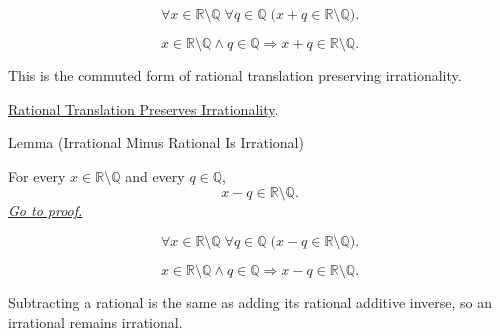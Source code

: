 \begin{remark*}
\[
\forall x\in\mathbb{R}\setminus\mathbb{Q}\;\forall q\in\mathbb{Q}\;
\bigl(x+q\in\mathbb{R}\setminus\mathbb{Q}\bigr).
\]
\end{remark*}

\begin{remark*}
\[
x\in\mathbb{R}\setminus\mathbb{Q}\land q\in\mathbb{Q}
\Longrightarrow x+q\in\mathbb{R}\setminus\mathbb{Q}.
\]
\end{remark*}

\begin{remark*}[Interpretation]
This is the commuted form of rational translation preserving irrationality.
\end{remark*}

\begin{dependencies}
\hyperref[lem:rational-translation-preserves-irrationality]{Rational Translation Preserves Irrationality}.
\end{dependencies}

\begin{lemmabox}{Lemma (Irrational Minus Rational Is Irrational)}
\begin{lemma}
\label{lem:irrational-minus-rational-is-irrational}
For every $x\in\mathbb{R}\setminus\mathbb{Q}$ and every $q\in\mathbb{Q}$,
\[
  x-q\in\mathbb{R}\setminus\mathbb{Q}.
\]
\hyperref[prf:irrational-minus-rational-is-irrational]{\textit{Go to proof.}}
\end{lemma}
\end{lemmabox}

\begin{remark*}
\[
\forall x\in\mathbb{R}\setminus\mathbb{Q}\;\forall q\in\mathbb{Q}\;
\bigl(x-q\in\mathbb{R}\setminus\mathbb{Q}\bigr).
\]
\end{remark*}

\begin{remark*}
\[
x\in\mathbb{R}\setminus\mathbb{Q}\land q\in\mathbb{Q}
\Longrightarrow x-q\in\mathbb{R}\setminus\mathbb{Q}.
\]
\end{remark*}

\begin{remark*}[Interpretation]
Subtracting a rational is the same as adding its rational additive inverse, so
an irrational remains irrational.
\end{remark*}

